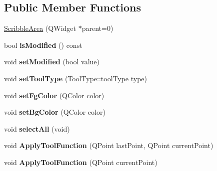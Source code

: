 \subsection*{Public Member Functions}
\begin{DoxyCompactItemize}
\item 
\hyperlink{class_scribble_area_a3560f2a44b46531591a1f4b1e42ea86f}{Scribble\-Area} (Q\-Widget $\ast$parent=0)
\item 
\hypertarget{class_scribble_area_a39eccfe97fab1b788cc873d5de7fce46}{bool {\bfseries is\-Modified} () const }\label{class_scribble_area_a39eccfe97fab1b788cc873d5de7fce46}

\item 
\hypertarget{class_scribble_area_a654dbfae57876cc88bcc08f6fc06611e}{void {\bfseries set\-Modified} (bool value)}\label{class_scribble_area_a654dbfae57876cc88bcc08f6fc06611e}

\item 
\hypertarget{class_scribble_area_acb1671a94370515af09a2530170d594f}{void {\bfseries set\-Tool\-Type} (Tool\-Type\-::tool\-Type type)}\label{class_scribble_area_acb1671a94370515af09a2530170d594f}

\item 
\hypertarget{class_scribble_area_a6a7a010f7d73e8ceaed52e1253dbcdd0}{void {\bfseries set\-Fg\-Color} (Q\-Color color)}\label{class_scribble_area_a6a7a010f7d73e8ceaed52e1253dbcdd0}

\item 
\hypertarget{class_scribble_area_a9f858c56ae7f5e06a11dbc022c8caf02}{void {\bfseries set\-Bg\-Color} (Q\-Color color)}\label{class_scribble_area_a9f858c56ae7f5e06a11dbc022c8caf02}

\item 
\hypertarget{class_scribble_area_af463a9e82b63ca30be22df4c01e8436a}{void {\bfseries select\-All} (void)}\label{class_scribble_area_af463a9e82b63ca30be22df4c01e8436a}

\item 
\hypertarget{class_scribble_area_a0c9f70e3ce6d57c25dd641cb7e14bb38}{void {\bfseries Apply\-Tool\-Function} (Q\-Point last\-Point, Q\-Point current\-Point)}\label{class_scribble_area_a0c9f70e3ce6d57c25dd641cb7e14bb38}

\item 
\hypertarget{class_scribble_area_ae4e8671f48893ab00eefbf2b6e843621}{void {\bfseries Apply\-Tool\-Function} (Q\-Point current\-Point)}\label{class_scribble_area_ae4e8671f48893ab00eefbf2b6e843621}


\end{DoxyCompactItemize}
